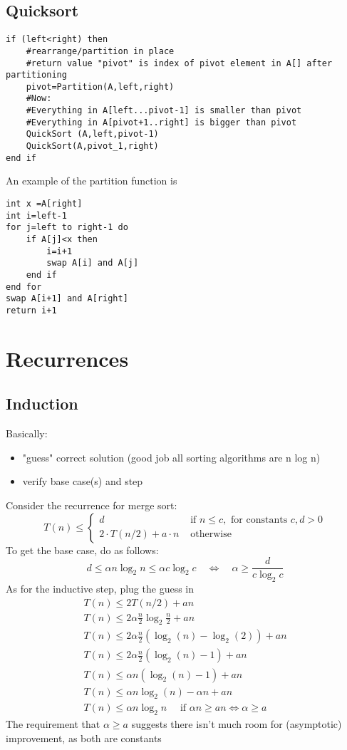 \documentclass{article}[18pt]
\begin{document}
\subsection{Quicksort}
\begin{lstlisting}[caption={QuickSort(int {$A[1..n]$}, int left, int right)}]
if (left<right) then
	#rearrange/partition in place
	#return value "pivot" is index of pivot element in A[] after partitioning
	pivot=Partition(A,left,right)
	#Now:
	#Everything in A[left...pivot-1] is smaller than pivot
	#Everything in A[pivot+1..right] is bigger than pivot
	QuickSort (A,left,pivot-1)
	QuickSort(A,pivot_1,right)
end if
\end{lstlisting}
An example of the partition function is
\begin{lstlisting}[caption={int Partition({$A[1...n]$}, int left, int right)}]
int x =A[right]
int i=left-1
for j=left to right-1 do
	if A[j]<x then
		i=i+1
		swap A[i] and A[j]
	end if
end for
swap A[i+1] and A[right]
return i+1
\end{lstlisting}
\section{Recurrences}
\subsection{Induction}
Basically:
\begin{itemize}
	\item "guess" correct solution (good job all sorting algorithms are n log n)
	\item verify base case(s) and step
\end{itemize}
Consider the recurrence for merge sort:
\[
T(n) \leq \left\{\begin{array}{ll}{d} & {\text { if } n \leq c, \text { for constants } c, d>0} \\ {2 \cdot T(n / 2)+a \cdot n} & {\text { otherwise }}\end{array}\right.
\]
To get the base case, do as follows:
\[
d \leq \alpha n \log _{2} n \leq \alpha c \log _{2} c \quad \Leftrightarrow \quad \alpha \geq \frac{d}{c \log _{2} c}
\]
As for the inductive step, plug the guess in
\[
\begin{array}{l}{T(n) \leq 2 T(n / 2)+a n} \\ {T(n) \leq 2 \alpha \frac{n}{2} \log _{2} \frac{n}{2}+a n} \\ {T(n) \leq 2 \alpha \frac{n}{2}\left(\log _{2}(n)-\log _{2}(2)\right)+a n} \\ {T(n) \leq 2 \alpha \frac{n}{2}\left(\log _{2}(n)-1\right)+a n} \\ {T(n) \leq \alpha n\left(\log _{2}(n)-1\right)+a n} \\ {T(n) \leq \alpha n \log _{2}(n)-\alpha n+a n} \\ {T(n) \leq \alpha n \log _{2} n \quad \text { if } \alpha n \geq a n \Leftrightarrow \alpha \geq a}\end{array}
\]
The requirement that $\alpha\geqslant a$ suggests there isn't much room for (asymptotic) improvement, as both are constants
\end{document}
